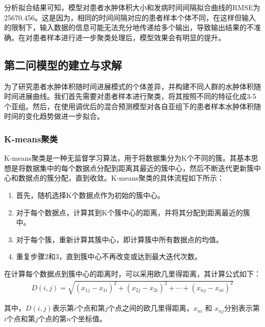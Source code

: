 \documentclass[bwprint]{gmcmthesis}
\begin{document}
分析拟合结果可知，模型对患者水肿体积大小和发病时间间隔拟合曲线的RMSE为25670.456。这是因为，相同的时间间隔对应的患者样本个体不同，在这样但输入的限制下，输入数据的信息可能无法充分地传递给多个输出，导致输出结果的不准确。在对患者样本进行进一步聚类处理后，模型效果会有明显的提升。

\subsection{第二问模型的建立与求解}
为了研究患者水肿体积随时间进展模式的个体差异，并构建不同人群的水肿体积随时间进展曲线。我们首先需要对患者样本进行聚类，将其按照不同的特征化成3-5个亚组。然后，在使用调优后的混合预测模型对各自亚组下的患者样本水肿体积随时间的变化趋势做进一步拟合。
\subsubsection{K-means聚类}
K-means聚类是一种无监督学习算法，用于将数据集分为K个不同的簇\cite{likas2003global}。其基本思想是将数据集中的每个数据点分配到距离其最近的簇中心，然后不断迭代更新簇中心和数据点的簇分配，直到收敛。K-means聚类的具体流程如下所示：
\begin{enumerate}
    \item  首先，随机选择K个数据点作为初始的簇中心。
    \item  对于每个数据点，计算其到K个簇中心的距离，并将其分配到距离最近的簇中。
    \item  对于每个簇，重新计算其簇中心，即计算簇中所有数据点的均值。
    \item  重复步骤2和3，直到簇中心不再改变或达到最大迭代次数。
\end{enumerate}\par
在计算每个数据点到簇中心的距离时，可以采用欧几里得距离，其计算公式如下：
\begin{equation}
\begin{aligned}
D(i,j) = \sqrt{(x_{1j} - x_{1i})^{2} + (x_{2j} - x_{2i})^{2} + \cdots + (x_{nj} - x_{ni})^{2}}
\end{aligned}
\label{equ:欧几里得距离}
\end{equation}

其中，$D(i,j)$表示第$i$个点和第$j$个点之间的欧几里得距离，$x_{n i}$ 和 $x_{n j}$分别表示第$i$个点和第$j$个点的第$n$个坐标值。
\end{document}
